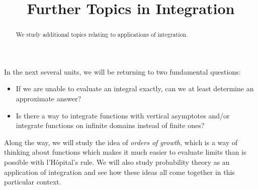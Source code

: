 \documentclass{ximera}
\title{Further Topics in Integration}
\begin{document}
\begin{abstract}
We study additional topics relating to applications of integration.
\end{abstract}
\maketitle

In the next several units, we will be returning to two fundamental questions:
\begin{itemize}
\item If we are unable to evaluate an integral exactly, can we at least determine an approximate answer?
\item Is there a way to integrate functions with vertical asymptotes and/or integrate functions on infinite domains instead of finite ones?
\end{itemize}
Along the way, we will study the idea of \textit{orders of growth}, which is a way of thinking about functions which makes it much easier to evaluate limits than is possible with l'H\^{o}pital's rule. We will also study probability theory as an application of integration and see how these ideas all come together in this particular context.
\end{document}
